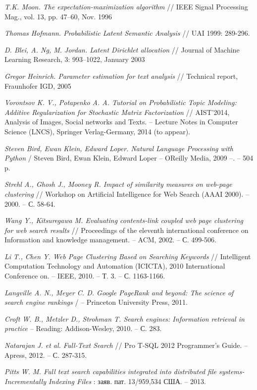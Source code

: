 \documentclass[12pt]{report}
\begin{document}
\begin{thebibliography}{99}
{\it  T.K. Moon. The expectation-maximization algorithm } // IEEE Signal Processing Mag., vol. 13, pp. 47–60, Nov. 1996

{\it Thomas Hofmann. Probabilistic Latent Semantic Analysis } // UAI 1999: 289-296. 

{\it D. Blei, A. Ng, M. Jordan. Latent Dirichlet allocation } // Journal of Machine Learning Research, 3: 993–1022, January 2003  

{\it Gregor Heinrich. Parameter estimation for text analysis} // Technical report, Fraunhofer IGD, 2005

{\it Vorontsov K. V., Potapenko A. A. Tutorial on Probabilistic Topic Modeling: Additive Regularization for Stochastic Matrix Factorization } // AIST'2014, Analysis of Images, Social networks and Texts. -- Lecture Notes in Computer Science (LNCS), Springer Verlag-Germany, 2014 (to appear). 

{\it Steven Bird, Ewan Klein, Edward Loper. Natural Language Processing with Python } / Steven Bird, Ewan Klein, Edward Loper -- OReilly Media, 2009 --. -- 504 p.

{\it Strehl A., Ghosh J., Mooney R. Impact of similarity measures on web-page clustering} // Workshop on Artificial Intelligence for Web Search (AAAI 2000). – 2000. – С. 58-64.

{\it Wang Y., Kitsuregawa M. Evaluating contents-link coupled web page clustering for web search results} // Proceedings of the eleventh international conference on Information and knowledge management. – ACM, 2002. – С. 499-506.

{\it Li T., Chen Y. Web Page Clustering Based on Searching Keywords} // Intelligent Computation Technology and Automation (ICICTA), 2010 International Conference on. – IEEE, 2010. – Т. 3. – С. 1163-1166.

{\it Langville A. N., Meyer C. D. Google PageRank and beyond: The science of search engine rankings} / -- Princeton University Press, 2011.

{\it Croft W. B., Metzler D., Strohman T. Search engines: Information retrieval in practice} -- Reading: Addison-Wesley, 2010. -- С. 283.

{\it Natarajan J. et al. Full-Text Search} // Pro T-SQL 2012 Programmer’s Guide. -- Apress, 2012. -- С. 287-315.

{\it  Pitts W. M. Full text search capabilities integrated into distributed file systems-Incrementally Indexing Files} : заяв. пат. 13/959,534 США. – 2013.


\end{thebibliography}
\end{document}
